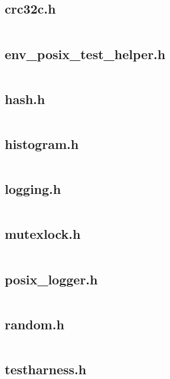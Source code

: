 \documentclass{article}
\begin{document}
\subsection{crc32c.h}
\inputminted{cpp}{/home/dufferzafar/dev/@clones/bitcoin/src/leveldb/util/crc32c.h}
\newpage

\subsection{env\_posix\_test\_helper.h}
\inputminted{cpp}{/home/dufferzafar/dev/@clones/bitcoin/src/leveldb/util/env_posix_test_helper.h}
\newpage

\subsection{hash.h}
\inputminted{cpp}{/home/dufferzafar/dev/@clones/bitcoin/src/leveldb/util/hash.h}
\newpage

\subsection{histogram.h}
\inputminted{cpp}{/home/dufferzafar/dev/@clones/bitcoin/src/leveldb/util/histogram.h}
\newpage

\subsection{logging.h}
\inputminted{cpp}{/home/dufferzafar/dev/@clones/bitcoin/src/leveldb/util/logging.h}
\newpage

\subsection{mutexlock.h}
\inputminted{cpp}{/home/dufferzafar/dev/@clones/bitcoin/src/leveldb/util/mutexlock.h}
\newpage

\subsection{posix\_logger.h}
\inputminted{cpp}{/home/dufferzafar/dev/@clones/bitcoin/src/leveldb/util/posix_logger.h}
\newpage

\subsection{random.h}
\inputminted{cpp}{/home/dufferzafar/dev/@clones/bitcoin/src/leveldb/util/random.h}
\newpage

\subsection{testharness.h}
\inputminted{cpp}{/home/dufferzafar/dev/@clones/bitcoin/src/leveldb/util/testharness.h}
\newpage
\end{document}
